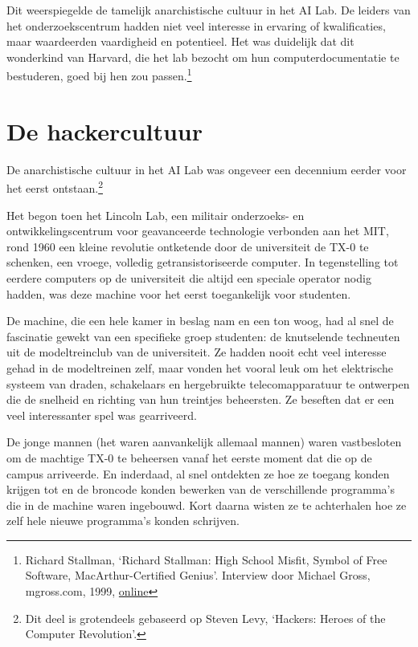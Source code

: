 \documentclass[
  a5paper,
  smalldemyvopaper,11pt,twoside,onecolumn,openright,extrafontsizes]{memoir}
\begin{document}
Dit weerspiegelde de tamelijk anarchistische cultuur in het AI Lab. De
leiders van het onderzoekscentrum hadden niet veel interesse in ervaring
of kwalificaties, maar waardeerden vaardigheid en potentieel. Het was
duidelijk dat dit wonderkind van Harvard, die het lab bezocht om hun
computerdocumentatie te bestuderen, goed bij hen zou passen.\footnote{Richard
  Stallman, `Richard Stallman: High School Misfit, Symbol of Free
  Software, MacArthur-Certified Genius'. Interview door Michael Gross,
  mgross.com, 1999,
  \href{https://www.mgross.com/writing/books/my-generation/bonus-chapters/richard-stallman-high-school-misfit-symbol-of-free-software-macarthur-certified-genius/.}{online}}

\section{De hackercultuur}\label{de-hackercultuur}

De anarchistische cultuur in het AI Lab was ongeveer een decennium
eerder voor het eerst ontstaan.\footnote{Dit deel is grotendeels
  gebaseerd op Steven Levy, `Hackers: Heroes of the Computer
  Revolution'.}

Het begon toen het Lincoln Lab, een militair onderzoeks- en
ontwikkelingscentrum voor geavanceerde technologie verbonden aan het
MIT, rond 1960 een kleine revolutie ontketende door de universiteit de
TX-0 te schenken, een vroege, volledig getransistoriseerde computer. In
tegenstelling tot eerdere computers op de universiteit die altijd een
speciale operator nodig hadden, was deze machine voor het eerst
toegankelijk voor studenten.

De machine, die een hele kamer in beslag nam en een ton woog, had al
snel de fascinatie gewekt van een specifieke groep studenten: de
knutselende techneuten uit de modeltreinclub van de universiteit. Ze
hadden nooit echt veel interesse gehad in de modeltreinen zelf, maar
vonden het vooral leuk om het elektrische systeem van draden,
schakelaars en hergebruikte telecomapparatuur te ontwerpen die de
snelheid en richting van hun treintjes beheersten. Ze beseften dat er
een veel interessanter spel was gearriveerd.

De jonge mannen (het waren aanvankelijk allemaal mannen) waren
vastbesloten om de machtige TX-0 te beheersen vanaf het eerste moment
dat die op de campus arriveerde. En inderdaad, al snel ontdekten ze hoe
ze toegang konden krijgen tot en de broncode konden bewerken van de
verschillende programma's die in de machine waren ingebouwd. Kort daarna
wisten ze te achterhalen hoe ze zelf hele nieuwe programma's konden
schrijven.
\end{document}
